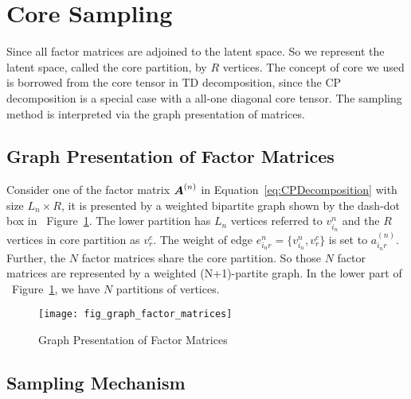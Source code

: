 \documentclass[letterpaper]{article}
\newcommand{\M}[1]{{\bm{{\MakeUppercase{#1}}}}}
\newcommand{\Mn}[2]{\M{#1}^{(#2)}}
\newcommand{\Eqn}[1]   {Equation~\ref{eq:#1}}
\newcommand{\Fig}[1]   {Figure~\ref{fig:#1}}
\begin{document}
\section{Core Sampling}
Since all factor matrices are adjoined to the latent space.
So we represent the latent space, called the core partition, by $R$ vertices.
The concept of core we used is borrowed from the core tensor in TD decomposition,
since the CP decomposition is a special case with a all-one diagonal core tensor.
The sampling method is interpreted via the graph presentation of matrices.

\subsection{Graph Presentation of Factor Matrices}
Consider one of the factor matrix $\Mn{A}{n}$ in \Eqn{CPDecomposition}
with size $L_n \times R$,
it is presented by a weighted bipartite graph shown by the dash-dot box in ~\Fig{GraphMatrices}.
The lower partition has $L_n$ vertices referred to $v^n_{i_n}$
and the $R$ vertices in core partition as $v^c_r$.
The weight of edge $e^n_{i_nr} = \{v^{n}_{i_n},v^c_r\}$ is set to $a^{(n)}_{i_nr}$.
Further, the $N$ factor matrices share the core partition.
So those $N$ factor matrices are represented by a weighted (N+1)-partite graph.
In the lower part of ~\Fig{GraphMatrices}, we have $N$ partitions of vertices.
\begin{figure}[t]
  \centering
  \texttt{[image: fig\_graph\_factor\_matrices]}\\
  \caption{Graph Presentation of Factor Matrices}
  \label{fig:GraphMatrices}
\end{figure}
\subsection{Sampling Mechanism}
\end{document}

